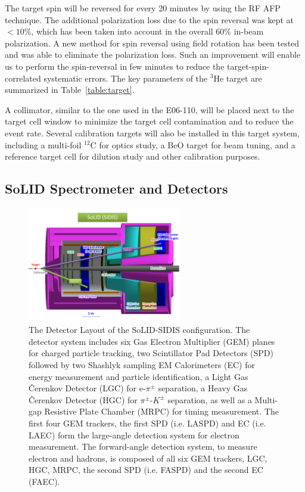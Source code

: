 The target spin will be reversed for every 20 minutes by using the RF AFP
technique. The additional polarization loss due to the spin reversal was kept
at $<10\%$, which has been taken into account in the overall 60\% in-beam
polarization. A new method for spin reversal using field rotation has been
tested and was able to eliminate the polarization loss. Such an improvement
will enable us to perform the spin-reversal in few minutes to reduce the
target-spin-correlated systematic errors. The key parameters of the
$\mathrm{^{3}He}$ target are summarized in Table~\ref{table:target}.
  
A collimator, similar to the one used in the E06-110, will be placed next to
the target cell window to minimize the target cell contamination and to reduce
the event rate. Several calibration targets will also be installed in this
target system, including a multi-foil $^{12}$C for optics study, a BeO target
for beam tuning, and a reference target cell for dilution study and other
calibration purposes.
  
  \subsection {SoLID Spectrometer and Detectors} 
\begin{figure}[!h]
 \begin{center}
  \includegraphics[width=0.6\textwidth]{./figures/SoLID_SIDIS_setup.pdf}
   \caption[The Detector Layout of the SoLID-SIDIS
     configuration]{\footnotesize{The Detector Layout of the SoLID-SIDIS
       configuration. The detector system includes six Gas Electron Multiplier
       (GEM) planes for charged particle tracking, two Scintillator Pad
       Detectors (SPD) followed by two Shashlyk sampling EM Calorimeters (EC)
       for energy measurement and particle identification, a Light Gas
       \v{C}erenkov Detector (LGC) for e-$\pi^{\pm}$ separation, a Heavy Gas
       \v{C}erenkov Detector (HGC) for $\pi^{\pm}$-$K^{\pm}$ separation, as
       well as a Multi-gap Resistive Plate Chamber (MRPC) for timing
       measurement. The first four GEM trackers, the first SPD (i.e. LASPD) and
       EC (i.e. LAEC) form the large-angle detection system for electron
       measurement. The forward-angle detection system, to measure electron and
       hadrons, is composed of all six GEM trackers, LGC, HGC, MRPC, the second
       SPD (i.e. FASPD) and the second EC (FAEC).}}
   \label{solid_sidis}
 \end{center}
\end{figure}

